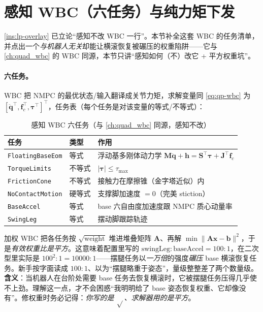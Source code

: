 \section{感知 WBC（六任务）与纯力矩下发}
\label{sec:lp-wbc}

\cref{ins:lp-overlay} 已立论“感知不改 WBC 一行”。本节补全这套 WBC 的任务清单，并点出一个\emph{与机器人无关}却能让横滚恢复被碾压的权重陷阱——它与 \cref{ch:quad_wbc} 的 WBC 同源，本节只讲“感知如何（不）改它 + 平方权重坑”。

\paragraph{六任务。}
WBC 把 NMPC 的最优状态/输入翻译成关节力矩，求解变量同 \cref{eq:qp-wbc} 为 $[\ddot{\mathbf{q}}^\top,\mathbf{f}_c^\top,\boldsymbol{\tau}^\top]^\top$，任务表（每个任务是对该变量的等式/不等式）：

\begin{table}[H]\centering\small
\caption{感知 WBC 六任务（与 \cref{ch:quad_wbc} 同源，感知不改）}
\begin{tabular}{p{} p{} p{}}
\toprule
任务 & 类型 & 作用 \\
\midrule
\texttt{FloatingBaseEom} & 等式 & 浮动基多刚体动力学 $\mathbf{M}\ddot{\mathbf{q}}+\mathbf{h}=\mathbf{S}^\top\boldsymbol{\tau}+\mathbf{J}^\top\mathbf{f}_c$ \\
\texttt{TorqueLimits} & 不等式 & $|\boldsymbol{\tau}|\le \tau_{\max}$ \\
\texttt{FrictionCone} & 不等式 & 接触力在摩擦锥（金字塔近似）内 \\
\texttt{NoContactMotion} & 硬等式 & 支撑脚加速度 $=0$（完美 stiction）\\
\texttt{BaseAccel} & 等式 & base 六自由度加速度跟 NMPC 质心动量率 \\
\texttt{SwingLeg} & 等式 & 摆动脚跟踪轨迹 \\
\bottomrule
\end{tabular}
\label{tab:lp-wbc}
\end{table}

\begin{pitfall}[加权 WBC 的权重进 $\mathbf{H}=\mathbf{A}^\top\mathbf{A}$ 是\emph{平方}的]\label{pit:lp-square-weight}
加权 WBC 把各任务按 $\sqrt{\text{weight}}$ 堆进堆叠矩阵 $\mathbf{A}$、再解 $\min\|\mathbf{A}\mathbf{x}-\mathbf{b}\|^2$，于是\emph{有效权重比是平方}。这意味着配置里写的 $\text{swingLeg}{:}\text{baseAccel}=100{:}1$，在二次型里实际是 $100^2{:}1=10000{:}1$——摆腿任务以\emph{一万倍}的强度\emph{碾压} base 横滚恢复任务。新手按字面读成 $100{:}1$、以为“摆腿略重于姿态”，量级整整差了两个数量级。\textbf{含义}：当机器人在台阶处需要 base 任务去恢复横滚时，它被摆腿任务压得几乎使不上劲。理解这一点，才不会困惑“我明明给了 base 姿态恢复权重、它却像没有”。修权重时务必记得：\emph{你写的是 $\sqrt{}$、求解器用的是平方}。
\end{pitfall}

